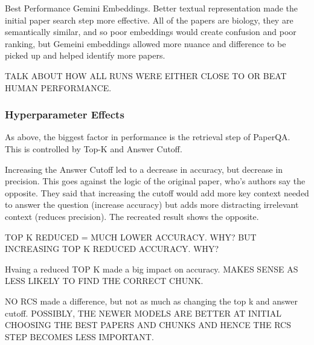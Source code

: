 Best Performance Gemini Embeddings. Better textual representation made the initial paper search step more effective. All of the papers are biology, they are semantically similar, and so poor embeddings would create confusion and poor ranking, but Gemeini embeddings allowed more nuance and difference to be picked up and helped identify more papers.

TALK ABOUT HOW ALL RUNS WERE EITHER CLOSE TO OR BEAT HUMAN PERFORMANCE. 



\subsubsection{Hyperparameter Effects}
As above, the biggest factor in performance is the retrieval step of PaperQA.
This is controlled by Top-K and Answer Cutoff.

Increasing the Answer Cutoff led to a decrease in accuracy, but decrease in precision. This goes against the logic of the original paper, who's authors say the opposite. They said that increasing the cutoff would add more key context needed to answer the question (increase accuracy) but adds more distracting irrelevant context (reduces precision). The recreated result shows the opposite. 

TOP K REDUCED = MUCH LOWER ACCURACY. WHY? BUT INCREASING TOP K REDUCED ACCURACY. WHY?

Hvaing a reduced TOP K made a big impact on accuracy. MAKES SENSE AS LESS LIKELY TO FIND THE CORRECT CHUNK. 

NO RCS made a difference, but not as much as changing the top k and answer cutoff. POSSIBLY, THE NEWER MODELS ARE BETTER AT INITIAL CHOOSING THE BEST PAPERS AND CHUNKS AND HENCE THE RCS STEP BECOMES LESS IMPORTANT. 

